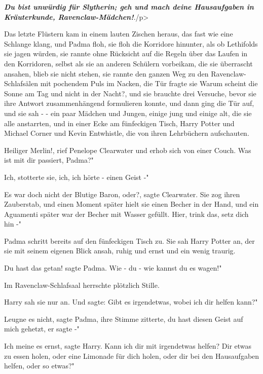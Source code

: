 \textbf{\emph{Du bist unwürdig für
Slytherin; geh und mach deine Hausaufgaben in Kräuterkunde,
Ravenclaw-Mädchen!}}\grqq{}./p>

Das letzte Flüstern kam in einem lauten Zischen heraus, das fast wie eine
Schlange klang, und Padma floh, sie floh die Korridore hinunter, als ob
Lethifolds sie jagen würden, sie rannte ohne Rücksicht auf die Regeln über das
Laufen in den Korridoren, selbst als sie an anderen Schülern vorbeikam, die sie
überrascht ansahen, blieb sie nicht stehen, sie rannte den ganzen Weg zu den
Ravenclaw-Schlafsälen mit pochendem Puls im Nacken, die Tür fragte sie \glqq{}
Warum scheint die Sonne am Tag und nicht in der Nacht?\grqq{}, und sie brauchte
drei Versuche, bevor sie ihre Antwort zusammenhängend formulieren konnte, und
dann ging die Tür auf, und sie sah - - ein paar Mädchen und Jungen, einige jung
und einige alt, die sie alle anstarrten, und in einer Ecke am fünfeckigen Tisch,
Harry Potter und Michael Corner und Kevin Entwhistle, die von ihren Lehrbüchern
aufschauten.

\glqq{}Heiliger Merlin!\grqq{}, rief Penelope Clearwater und erhob sich von einer
Couch. \glqq{}Was ist mit dir passiert, Padma?"

\glqq{}Ich\grqq{}, stotterte sie, \glqq{}ich, ich hörte - einen Geist -"

\glqq{}Es war doch nicht der Blutige Baron, oder?\grqq{}, sagte Clearwater. Sie
zog ihren Zauberstab, und einen Moment später hielt sie einen Becher in der
Hand, und ein Aguamenti später war der Becher mit Wasser gefüllt. \glqq{}Hier,
trink das, setz dich hin -"

Padma schritt bereits auf den fünfeckigen Tisch zu. Sie sah Harry Potter an, der
sie mit seinem eigenen Blick ansah, ruhig und ernst und ein wenig traurig.

\glqq{}Du hast das getan!\grqq{} sagte Padma. \glqq{}Wie - du - wie kannst du es
wagen!"

Im Ravenclaw-Schlafsaal herrschte plötzlich Stille.

Harry sah sie nur an. Und sagte: \glqq{}Gibt es irgendetwas, wobei ich dir helfen
kann?"

\glqq{}Leugne es nicht\grqq{}, sagte Padma, ihre Stimme zitterte, \glqq{}du hast
diesen Geist auf mich gehetzt, er sagte -"

\glqq{}Ich meine es ernst\grqq{}, sagte Harry. \glqq{}Kann ich dir mit irgendetwas
helfen? Dir etwas zu essen holen, oder eine Limonade für dich holen, oder dir
bei den Hausaufgaben helfen, oder so etwas?"

